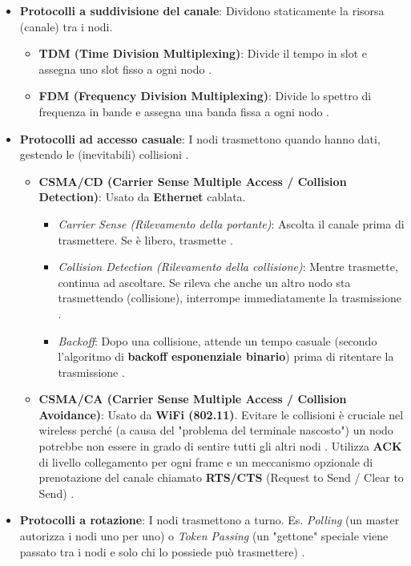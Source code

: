 \begin{itemize}
    \item \textbf{Protocolli a suddivisione del canale}: Dividono staticamente la risorsa (canale) tra i nodi.
        \begin{itemize}
            \item \textbf{TDM (Time Division Multiplexing)}: Divide il tempo in slot e assegna uno slot fisso a ogni nodo .
            \item \textbf{FDM (Frequency Division Multiplexing)}: Divide lo spettro di frequenza in bande e assegna una banda fissa a ogni nodo .
        \end{itemize}
    \item \textbf{Protocolli ad accesso casuale}: I nodi trasmettono quando hanno dati, gestendo le (inevitabili) collisioni .
        \begin{itemize}
            \item \textbf{CSMA/CD (Carrier Sense Multiple Access / Collision Detection)}: Usato da \textbf{Ethernet} cablata.
                \begin{itemize}
                    \item \textit{Carrier Sense (Rilevamento della portante)}: Ascolta il canale prima di trasmettere. Se è libero, trasmette .
                    \item \textit{Collision Detection (Rilevamento della collisione)}: Mentre trasmette, continua ad ascoltare. Se rileva che anche un altro nodo sta trasmettendo (collisione), interrompe immediatamente la trasmissione .
                    \item \textit{Backoff}: Dopo una collisione, attende un tempo casuale (secondo l'algoritmo di \textbf{backoff esponenziale binario}) prima di ritentare la trasmissione .
                \end{itemize}
            \item \textbf{CSMA/CA (Carrier Sense Multiple Access / Collision Avoidance)}: Usato da \textbf{WiFi (802.11)}. Evitare le collisioni è cruciale nel wireless perché (a causa del "problema del terminale nascosto") un nodo potrebbe non essere in grado di sentire tutti gli altri nodi . Utilizza \textbf{ACK} di livello collegamento per ogni frame e un meccanismo opzionale di prenotazione del canale chiamato \textbf{RTS/CTS} (Request to Send / Clear to Send) .
        \end{itemize}
    \item \textbf{Protocolli a rotazione}: I nodi trasmettono a turno. Es. \textit{Polling} (un master autorizza i nodi uno per uno) o \textit{Token Passing} (un "gettone" speciale viene passato tra i nodi e solo chi lo possiede può trasmettere) .
\end{itemize}


